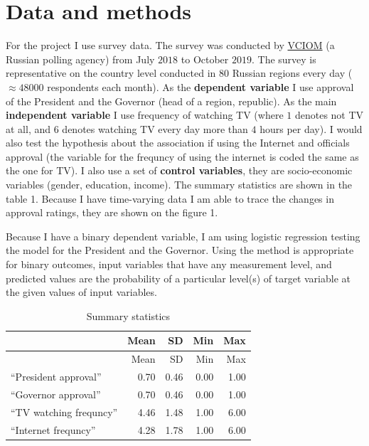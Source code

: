 \documentclass[
  english,
  man]{apa6}
\begin{document}
\hypertarget{data-and-methods}{%
\section{Data and methods}\label{data-and-methods}}

For the project I use survey data. The survey was conducted by \href{https://bd.wciom.ru/baza_dannykh_roper_center/}{VCIOM} (a Russian polling agency) from July \(2018\) to October \(2019\). The survey is representative on the country level conducted in \(80\) Russian regions every day (\(\approx 48000\) respondents each month). As the \textbf{dependent variable} I use approval of the President and the Governor (head of a region, republic). As the main \textbf{independent variable} I use frequency of watching TV (where \(1\) denotes not TV at all, and \(6\) denotes watching TV every day more than \(4\) hours per day). I would also test the hypothesis about the association if using the Internet and officials approval (the variable for the frequncy of using the internet is coded the same as the one for TV). I also use a set of \textbf{control variables}, they are socio-economic variables (gender, education, income). The summary statistics are shown in the table 1. Because I have time-varying data I am able to trace the changes in approval ratings, they are shown on the figure 1.

Because I have a binary dependent variable, I am using logistic regression testing the model for the President and the Governor. Using the method is appropriate for binary outcomes, input variables that have any measurement level, and predicted values are the probability of a particular level(s) of target variable at the given values of input variables.

\begin{longtable}[]{@{}lrrrr@{}}
\caption{\label{tab:unnamed-chunk-2}Summary statistics}\tabularnewline
\toprule
& Mean & SD & Min & Max\tabularnewline
\midrule
\endfirsthead
\toprule
& Mean & SD & Min & Max\tabularnewline
\midrule
\endhead
\enquote{President approval} & 0.70 & 0.46 & 0.00 & 1.00\tabularnewline
\enquote{Governor approval} & 0.70 & 0.46 & 0.00 & 1.00\tabularnewline
\enquote{TV watching frequncy} & 4.46 & 1.48 & 1.00 & 6.00\tabularnewline
\enquote{Internet frequncy} & 4.28 & 1.78 & 1.00 & 6.00\tabularnewline
\bottomrule
\end{longtable}
\end{document}
